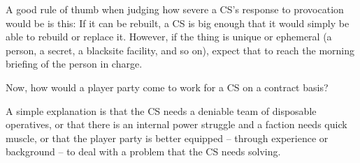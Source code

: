 A good rule of thumb when judging how severe a CS’s response to provocation would be is this: If
it can be rebuilt, a CS is big enough that it would simply be able to rebuild or replace it. However,
if the thing is unique or ephemeral (a person, a secret, a blacksite facility, and so on), expect that
to reach the morning briefing of the person in charge.

Now, how would a player party come to work for a CS on a contract basis?

A simple explanation is that the CS needs a deniable team of disposable operatives, or that there
is an internal power struggle and a faction needs quick muscle, or that the player party is better
equipped -- through experience or background -- to deal with a problem that the CS needs
solving.